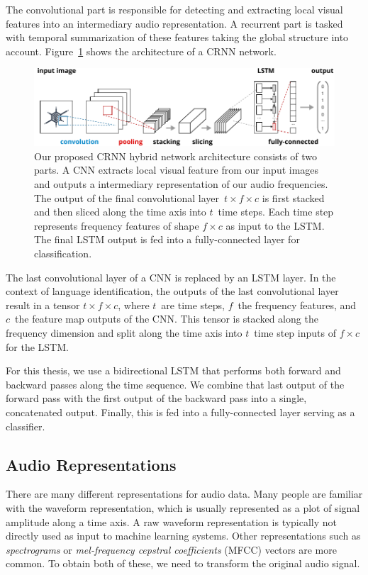 The convolutional part is responsible for detecting and extracting local visual features into an intermediary audio representation. A recurrent part is tasked with temporal summarization of these features taking the global structure into account. Figure~\ref{fig:crnn} shows the architecture of a CRNN network. 
%
	\begin{figure}[tp]
  		\centering
    	\includegraphics{img/crnn3.pdf}
    	\caption{Our proposed CRNN hybrid network architecture consists of two parts. A CNN extracts local visual feature from our input images and outputs a intermediary representation of our audio frequencies. The output of the final convolutional layer~$t \times f \times c$ is first stacked and then sliced along the time axis into $t$~time steps. Each time step represents  frequency features of shape $f \times c$ as input to the LSTM. The final LSTM output is fed into a fully-connected layer for classification.}
    	\label{fig:crnn}
	\end{figure}
	The last convolutional layer of a CNN is replaced by an LSTM layer. In the context of language identification, the outputs of the last convolutional layer result in a tensor $t \times f \times c$, where $t$~are time steps, $f$~the frequency features, and $c$~the feature map outputs of the CNN. This tensor is stacked along the frequency dimension and split along the time axis into $t$~time step inputs of $ f \times c$ for the LSTM.
	
	For this thesis, we use a bidirectional LSTM that performs both forward and backward passes along the time sequence. We combine that last output of the forward pass with the first output of the backward pass into a single, concatenated output. Finally, this is fed into a fully-connected layer serving as a classifier.
	
\subsection{Audio Representations}
There are many different representations for audio data. Many people are familiar with the waveform representation, which is usually represented as a plot of signal amplitude along a time axis. A raw waveform representation is typically not directly used as input to machine learning systems.
Other representations such as \emph{spectrograms} or \emph{mel-frequency cepstral coefficients} (MFCC) vectors are more common. To obtain both of these, we need to transform the original audio signal.

